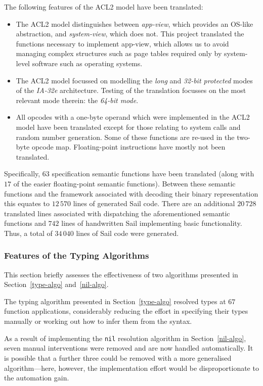 \documentclass[a4paper,12pt,twoside,openright]{report}
\begin{document}
The following features of the ACL2 model have been translated:

\begin{itemize}
  \item The ACL2 model distinguishes between \emph{app-view}, which provides an OS-like abstraction, and \emph{system-view}, which does not.  This project translated the functions necessary to implement app-view, which allows us to avoid managing complex structures such as page tables required only by system-level software such as operating systems.
  \item The ACL2 model focussed on modelling the \emph{long} and \emph{32-bit protected} modes of the \emph{IA-32e} architecture.  Testing of the translation focusses on the most relevant mode therein: the \emph{64-bit mode}.
  \item All opcodes with a one-byte operand which were implemented in the ACL2 model have been translated except for those relating to system calls and random number generation.  Some of these functions are re-used in the two-byte opcode map.  Floating-point instructions have mostly not been translated.
\end{itemize}

Specifically, $63$ specification semantic functions have been translated (along with $17$ of the easier floating-point semantic functions).  Between these semantic functions and the framework associated with decoding their binary representation this equates to $12\,570$ lines of generated Sail code.  There are an additional $20\,728$ translated lines associated with dispatching the aforementioned semantic functions and $742$ lines of handwritten Sail implementing basic functionality.  Thus, a total of $34\,040$ lines of Sail code were generated.

\subsubsection{Features of the Typing Algorithms}

This section briefly assesses the effectiveness of two algorithms presented in Section~\ref{type-algo} and~\ref{nil-algo}.

The typing algorithm presented in Section~\ref{type-algo} resolved types at $67$ function applications, considerably reducing the effort in specifying their types manually or working out how to infer them from the syntax.

As a result of implementing the \texttt{nil} resolution algorithm in Section~\ref{nil-algo}, seven manual interventions were removed and are now handled automatically.  It is possible that a further three could be removed with a more generalised algorithm---here, however, the implementation effort would be disproportionate to the automation gain.
\end{document}
